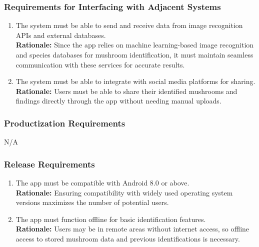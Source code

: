 \documentclass[]{article}
\begin{document}
\begin{enumerate}[{\bf BE1.}]
\subsubsection{Requirements for Interfacing with Adjacent Systems}
\label{ssub:requirements_for_interfacing_with_adjacent_systems}
\begin{enumerate}[{OE-IA}1. ]
	\item The system must be able to send and receive data from image recognition APIs and external databases.\\
	\textbf{Rationale:} Since the app relies on machine learning-based image recognition and species databases for mushroom identification, it must maintain seamless communication with these services for accurate results.
	\item The system must be able to integrate with social media platforms for sharing.\\
	\textbf{Rationale:}  Users must be able to share their identified mushrooms and findings directly through the app without needing manual uploads.
\end{enumerate}

\subsubsection{Productization Requirements}
\label{ssub:productization_requirements}
\hspace{1.5cm}     N/A 

\subsubsection{Release Requirements}
\label{ssub:release_requirements}
\begin{enumerate}[{OE-R}1. ]
	\item The app must be compatible with Android 8.0 or above.\\
	\textbf{Rationale:} Ensuring compatibility with widely used operating system versions maximizes the number of potential users.
	\item The app must function offline for basic identification features.\\
	\textbf{Rationale:} Users may be in remote areas without internet access, so offline access to stored mushroom data and previous identifications is necessary.
\end{enumerate}


\end{enumerate}
\end{document}
